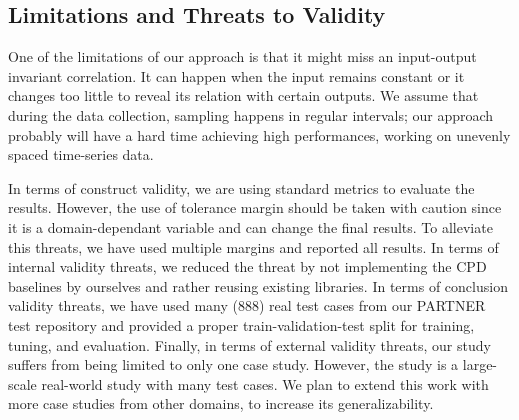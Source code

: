 \subsection{Limitations and Threats to Validity} \label{sec:threats_to_validity}
One of the limitations of our approach is that it might miss an input-output invariant correlation. It can happen when the input remains constant or it changes too little to reveal its relation with certain outputs. 
We assume that during the data collection, sampling happens in regular intervals; our approach probably will have a hard time achieving high performances, working on unevenly spaced time-series data.

In terms of construct validity, we are using standard metrics to evaluate the results. However, the use of tolerance margin should be taken with caution since it is a domain-dependant variable and can change the final results. To alleviate this threats, we have used multiple margins and reported all results. In terms of internal validity threats, we reduced the threat by not implementing the CPD baselines by ourselves and rather reusing existing libraries. In terms of conclusion validity threats, we have used many (888) real test cases from our PARTNER test repository and provided a proper train-validation-test split for training, tuning, and evaluation. Finally, in terms of external validity threats, our study suffers from being limited to only one case study. However, the study is a large-scale real-world study with many test cases. We plan to extend this work with more case studies from other domains, to increase its generalizability. 


 